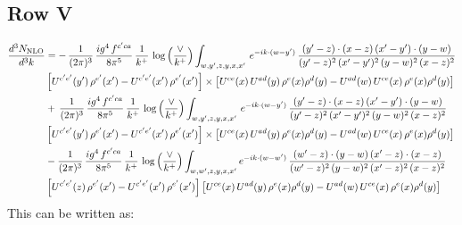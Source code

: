 \documentclass[9pt]{article}
\numberwithin{equation}{section}
\begin{document}
\subsection{Row V}
\begin{align}
    \frac{d^{3}N_{\rm NLO}}{d^{3}k} & =   -\,\frac{1}{(2\pi)^{3}}\, \frac{ig^{4}\,f^{c'ca}}{8\pi^{5}}\, \frac{1}{k^{+}}\,\log{\left(\frac{\vee}{k^{+}}\right)} \int_{w,y',z,y,x,x'}\, e^{-ik\cdot (w-y')}\,\frac{(y'-z)\cdot (x-z)\,(x'-y')\cdot (y-w)}{(y'-z)^{2}\,(x'-y')^{2}\,(y-w)^{2}\,(x-z)^{2}}\notag \\ & \left[U^{c'e'}(y')\,\rho^{e'}(x')-U^{c'e'}(x')\,\rho^{e'}(x')\right]\times  \left[U^{ce}(x)\,U^{ad}(y)\,\rho^{e}(x)\rho^{d}(y)-U^{ad}(w)\,U^{ce}(x)\,\rho^{e}(x)\rho^{d}(y)\right] \notag \\
&   +\,\frac{1}{(2\pi)^{3}}\, \frac{ig^{4}\,f^{c'ca}}{8\pi^{5}}\, \frac{1}{k^{+}}\,\log{\left(\frac{\vee}{k^{+}}\right)} \int_{w,y',z,y,x,x'}\, e^{-ik\cdot (w-y')}\,\frac{(y'-z)\cdot (x-z)\,(x'-y')\cdot (y-w)}{(y'-z)^{2}\,(x'-y')^{2}\,(y-w)^{2}\,(x-z)^{2}}\notag \\ &   \left[U^{c'e'}(y')\,\rho^{e'}(x')-U^{c'e'}(x')\,\rho^{e'}(x')\right]\times  \left[U^{ce}(x)\,U^{ad}(y)\,\rho^{e}(x)\rho^{d}(y)-U^{ad}(w)\,U^{ce}(x)\,\rho^{e}(x)\rho^{d}(y)\right] \notag \\
&   -\frac{1}{(2\pi)^{3}}\, \frac{ig^{4}\,f^{c'ca}}{8\pi^{5}}\, \frac{1}{k^{+}}\,\log{\left(\frac{\vee}{k^{+}}\right)}\int_{w,w',z,y,x,x'} e^{-ik\cdot (w-w')}\,\frac{(w'-z)\cdot (y-w)\,(x'-z)\cdot (x-z)}{(w'-z)^{2}\,(y-w)^{2}\,(x'-z)^{2}\,(x-z)^{2}}\notag \\
&   \left[U^{c'e'}(z)\,\rho^{e'}(x')-U^{c'e'}(x')\,\rho^{e'}(x')\right]\left[U^{ce}(x)\,U^{ad}(y)\,\rho^{e}(x)\rho^{d}(y)-U^{ad}(w)\,U^{ce}(x)\,\rho^{e}(x)\rho^{d}(y)\right]
\end{align}
This can be written as:
\end{document}
